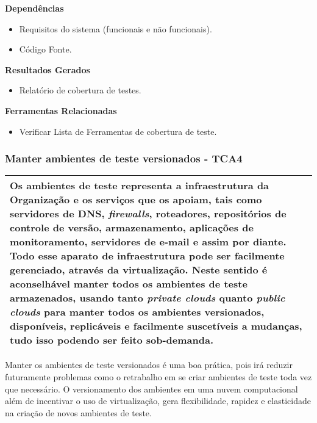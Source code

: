 \textbf{Dependências}
\begin{itemize}
    \item Requisitos do sistema (funcionais e não funcionais).
    \item Código Fonte.
\end{itemize}

\textbf{Resultados Gerados}
\begin{itemize}
    \item Relatório de cobertura de testes.

\end{itemize}

\textbf{Ferramentas Relacionadas}
\begin{itemize}
    \item Verificar Lista de Ferramentas de cobertura de teste.
\end{itemize}


\subsubsection{Manter ambientes de teste versionados - TCA4}
\label{sec:tca3}

\begin{table}[H]
\centering
\begin{tabular}{|p{130mm}|}
\hline
Os ambientes de teste representa a infraestrutura da Organização e os serviços que os apoiam, tais como servidores de DNS, \textit{firewalls}, roteadores, repositórios de controle de versão, armazenamento, aplicações de monitoramento, servidores de e-mail e assim por diante. Todo esse aparato de infraestrutura pode ser facilmente gerenciado, através da virtualização. Neste sentido é aconselhável manter todos os ambientes de teste armazenados, usando tanto \textit{private clouds} quanto \textit{public clouds} para manter todos os ambientes versionados, disponíveis, replicáveis e facilmente suscetíveis a mudanças, tudo isso podendo ser feito sob-demanda. \\ 
\hline
\end{tabular}
\end{table}

Manter os ambientes de teste versionados é uma boa prática, pois irá reduzir futuramente problemas como o retrabalho em se criar ambientes de teste toda vez que necessário. O versionamento dos ambientes em uma nuvem computacional além de incentivar o uso de virtualização, gera flexibilidade, rapidez e elasticidade na criação de novos ambientes de teste.

